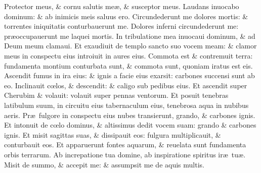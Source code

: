\documentclass[a5paper,10pt]{book}
\def\ae{æ}
\def\oe{œ}
\begin{document}
\begin{multicols*}{2}
\newline \color{red} P\color{black}rotector meus, \& cornu salutis me\ae , \& susceptor meus.
\newline \color{red} L\color{black}audans inuocabo dominum: \& ab inimicis meis saluus ero.
\newline \color{red} C\color{black}ircundederunt me dolores mortis: \& torrentes iniquitatis conturbauerunt me.
\newline \color{red} D\color{black}olores inferni circundederunt me: pr\ae occupauerunt me laquei mortis.
\newline \color{red} I\color{black}n tribulatione mea inuocaui dominum, \& ad Deum meum clamaui.
\newline \color{red} E\color{black}t exaudiuit de templo sancto suo vocem meam: \& clamor meus in conspectu eius introiuit in aures eius.
\newline \color{red} C\color{black}ommota est \& contremuit terra: fundamenta montium conturbata sunt, \& commota sunt, quoniam iratus est eis.
\newline \color{red} A\color{black}scendit fumus in ira eius: \& ignis a facie eius exarsit: carbones succensi sunt ab eo.
\newline \color{red} I\color{black}nclinauit c\oe los, \& descendit: \& caligo sub pedibus eius.
\newline \color{red} E\color{black}t ascendit super Cherubim \& volauit: volauit super pennas ventorum.
\newline \color{red} E\color{black}t posuit tenebras latibulum suum, in circuitu eius tabernaculum eius, tenebrosa aqua in nubibus aeris.
\newline \color{red} P\color{black}r\ae \ fulgore in conspectu eius nubes transierunt, grando, \& carbones ignis.
\newline \color{red} E\color{black}t intonuit de c\oe lo dominus, \& altissimus dedit vocem suam: grando \& carbones ignis.
\newline \color{red} E\color{black}t misit sagittas suas, \& dissipauit eos: fulgura multiplicauit, \& conturbauit eos.
\newline \color{red} E\color{black}t apparuerunt fontes aquarum, \& reuelata sunt fundamenta orbis terrarum.
\newline \color{red} A\color{black}b increpatione tua domine, ab inspiratione spiritus ir\ae \ tu\ae .
\newline \color{red} M\color{black}isit de summo, \& accepit me: \& assumpsit me de aquis multis.

\end{multicols*}
\end{document}
